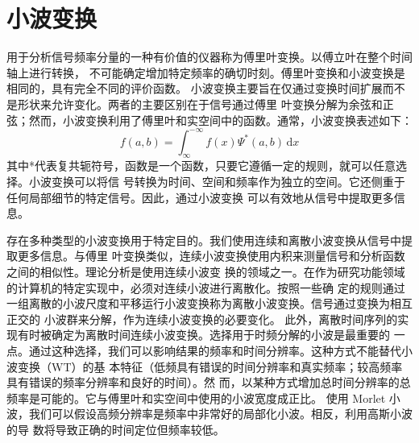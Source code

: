 \section{小波变换}

用于分析信号频率分量的一种有价值的仪器称为傅里叶变换。以傅立叶在整个时间轴上进行转换，
不可能确定增加特定频率的确切时刻。傅里叶变换和小波变换是相同的，具有完全不同的评价函数。
小波变换主要旨在仅通过变换时间扩展而不是形状来允许变化。两者的主要区别在于信号通过傅里
叶变换分解为余弦和正弦；然而，小波变换利用了傅里叶和实空间中的函数。通常，小波变换表述如下：
\begin{equation}
    f(a,b)=\int_{\infty}^{-\infty}f(x)\varPsi^*(a,b)\,\text{d}x \label{eq:wt}
\end{equation}
其中*代表复共轭符号，函数是一个函数，只要它遵循一定的规则，就可以任意选择。小波变换可以将信
号转换为时间、空间和频率作为独立的空间。它还侧重于任何局部细节的特定信号。因此，通过小波变换
可以有效地从信号中提取更多信息。\par
存在多种类型的小波变换用于特定目的。我们使用连续和离散小波变换从信号中提取更多信息。与傅里
叶变换类似，连续小波变换使用内积来测量信号和分析函数之间的相似性。理论分析是使用连续小波变
换的领域之一。在作为研究功能领域的计算机的特定实现中，必须对连续小波进行离散化。按照一些确
定的规则通过一组离散的小波尺度和平移运行小波变换称为离散小波变换。信号通过变换为相互正交的
小波群来分解，作为连续小波变换的必要变化。
此外，离散时间序列的实现有时被确定为离散时间连续小波变换。选择用于时频分解的小波是最重要的
一点。通过这种选择，我们可以影响结果的频率和时间分辨率。这种方式不能替代小波变换（WT）的基
本特征（低频具有错误的时间分辨率和真实频率；较高频率具有错误的频率分辨率和良好的时间）。然
而，以某种方式增加总时间分辨率的总频率是可能的。它与傅里叶和实空间中使用的小波宽度成正比。
使用 Morlet 小波，我们可以假设高频分辨率是频率中非常好的局部化小波。相反，利用高斯小波的导
数将导致正确的时间定位但频率较低。